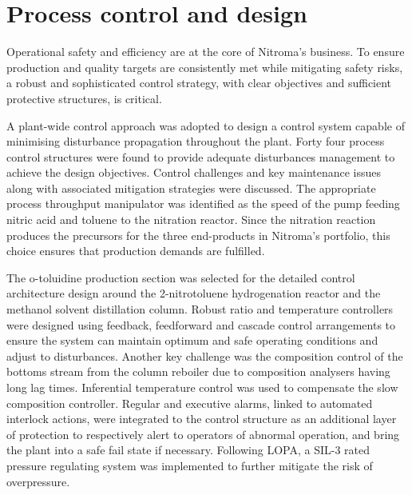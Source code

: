 \section*{Process control and design}

Operational safety and efficiency are at the core of Nitroma's business. To ensure production and quality targets are consistently met while mitigating safety risks, a robust and sophisticated control strategy, with clear objectives and sufficient protective structures, is critical.

A plant-wide control approach was adopted to design a control system capable of minimising disturbance propagation throughout the plant. Forty four process control structures were found to provide adequate disturbances management to achieve the design objectives. Control challenges and key maintenance issues along with associated mitigation strategies were discussed. The appropriate process throughput manipulator was identified as the speed of the pump feeding nitric acid and toluene to the nitration reactor. Since the nitration reaction produces the precursors for the three end-products in Nitroma's portfolio, this choice ensures that production demands are fulfilled.    

The o-toluidine production section was selected for the detailed control architecture design around the 2-nitrotoluene hydrogenation reactor and the methanol solvent distillation column. Robust ratio and temperature controllers were designed using feedback, feedforward and cascade control arrangements to ensure the system can maintain optimum and safe operating conditions and adjust to disturbances. Another key challenge was the composition control of the bottoms stream from the column reboiler due to composition analysers having long lag times. Inferential temperature control was used to compensate the slow composition controller. Regular and executive alarms, linked to automated interlock actions, were integrated to the control structure as an additional layer of protection to respectively alert to operators of abnormal operation, and bring the plant into a safe fail state if necessary. Following LOPA, a SIL-3 rated pressure regulating system was implemented to further mitigate the risk of overpressure.




